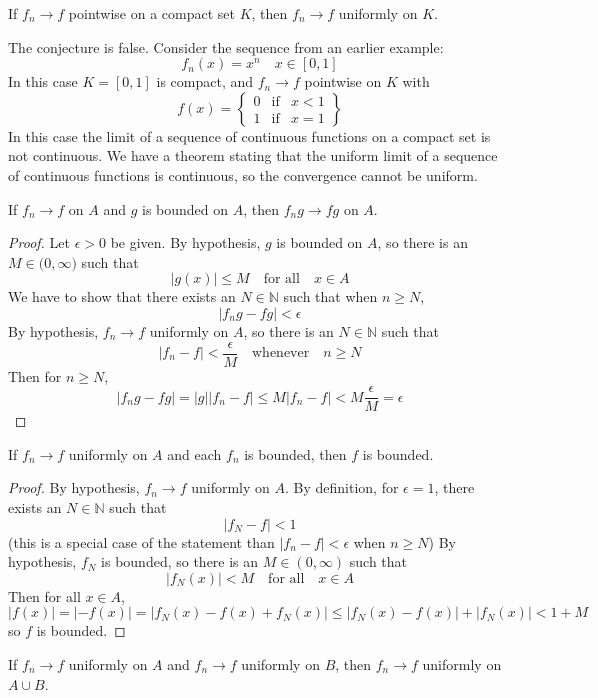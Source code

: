 \begin{conjecture*}
If $f_n\rightarrow f$ pointwise on a compact set $K$, then $f_n\rightarrow f$ uniformly on $K$.
\end{conjecture*}
\begin{remark}
The conjecture is false.  Consider the sequence from an earlier example:
\[
f_n(x) = x^n\quad x\in[0,1]
\]
In this case $K=[0,1]$ is compact, and $f_n\rightarrow f$ pointwise on $K$ with
\[
f(x)=\left\{\begin{array}{lcl}
0 &\mbox{if}& x<1\\
1 &\mbox{if}& x=1\end{array}\right\}
\]
In this case the limit of a sequence of continuous functions on a compact set is not continuous.  We have a theorem stating that the uniform limit of a sequence of continuous functions is continuous, so the convergence cannot be uniform.
\end{remark}
\begin{conjecture*}
If $f_n\rightarrow f$ on $A$ and $g$ is bounded on $A$, then $f_ng\rightarrow fg$ on $A$.
\end{conjecture*}
\begin{proof}
Let $\epsilon>0$ be given.  By hypothesis, $g$ is bounded on $A$, so there is an $M\in\mathbb(0,\infty)$ such that
\[
|g(x)|\leq M\quad\mbox{for all}\quad x\in A
\]
We have to show that there exists an $N\in\mathbb{N}$ such that when $n\geq N$,
\[
|f_ng-fg|<\epsilon
\]
By hypothesis, $f_n\rightarrow f$ uniformly on $A$, so there is an $N\in\mathbb{N}$ such that
\[
|f_n-f| < \frac{\epsilon}{M}\quad\mbox{whenever}\quad n\geq N
\]
Then for $n\geq N$,
\[
|f_ng-fg| =|g||f_n-f| \leq M|f_n-f| < M\frac{\epsilon}{M} = \epsilon
\]
\end{proof}
\begin{conjecture*}
If $f_n\rightarrow f$ uniformly on $A$ and each $f_n$ is bounded, then $f$ is bounded.
\end{conjecture*}
\begin{proof}
By hypothesis, $f_n\rightarrow f$ uniformly on $A$.  By definition, for $\epsilon=1$, there exists an $N\in\mathbb{N}$ such that
\[
|f_N-f| < 1
\]
(this is a special case of the statement than $|f_n-f|<\epsilon$ when $n\geq N$)
By hypothesis, $f_N$ is bounded, so there is an $M\in(0,\infty)$ such that
\[
|f_N(x)| < M\quad\mbox{for all}\quad x\in A
\]
Then for all $x\in A$,
\[
|f(x)| = |-f(x)| = |f_N(x)-f(x)+f_N(x)| \leq |f_N(x)-f(x)|+|f_N(x)| < 1+M 
\]
so $f$ is bounded.
\end{proof}
\begin{conjecture*}
If $f_n\rightarrow f$ uniformly on $A$ and $f_n\rightarrow f$ uniformly on $B$, then $f_n\rightarrow f$ uniformly on $A\cup B$.
\end{conjecture*}
